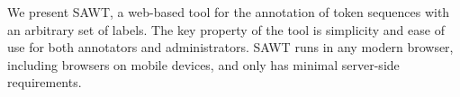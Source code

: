 We present SAWT, a web-based tool for the annotation of token sequences with an arbitrary set of labels. The key property of the tool is simplicity and ease of use for both annotators and administrators. SAWT runs in any modern browser, including browsers on mobile devices, and only has minimal server-side requirements.
